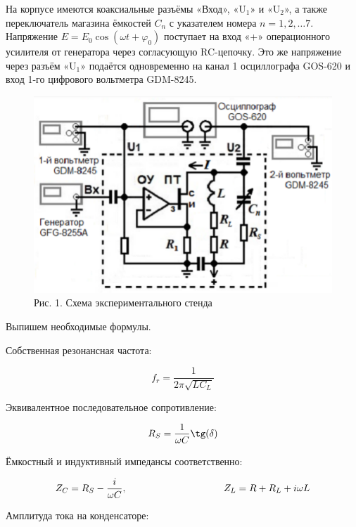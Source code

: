 \documentclass[a4paper,12pt]{article} %
\begin{document}
	
	На корпусе имеются коаксиальные разъёмы «Вход», «U$_1$» и «U$_2$», а также переключатель магазина ёмкостей $C_n$ с указателем номера $n = 1, 2, … 7$. Напряжение $E =E_0\cos(\omega t + \varphi_0)$ поступает на вход «+» операционного усилителя от генератора через согласующую RC-цепочку. Это же напряжение через разъём «U$_1$» подаётся одновременно на канал 1 осциллографа GOS-620 и вход 1-го цифрового вольтметра GDM-8245.
	\begin{figure}[h!]
		\centering
		\includegraphics[scale=0.6]{Установка.png}
		\caption*{Рис. 1. Схема экспериментального стенда}
	\end{figure}

\vspace{7mm}
Выпишем необходимые формулы.

Собственная резонансная частота:

\begin{equation*}
	f_r = \frac{1}{2\pi\sqrt{LC_L}}
\end{equation*}

Эквивалентное последовательное сопротивление:

\begin{equation*}
	R_S = \frac{1}{\omega C}\tg(\delta)
\end{equation*}

Ёмкостный и индуктивный импедансы соответственно:

\begin{equation*}
	Z_C = R_S - \frac{i}{\omega C}, \hspace{35mm} Z_L = R + R_L + i\omega L
\end{equation*}


Амплитуда тока на конденсаторе:
\end{document}
